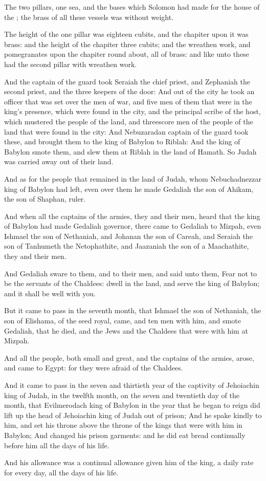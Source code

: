 \Verse The two pillars, one sea, and the bases which Solomon had made for the house of the \LORD; the brass of all these vessels was without weight.

\Verse The height of the one pillar was eighteen cubits, and the chapiter upon it was brass: and the height of the chapiter three cubits; and the wreathen work, and pomegranates upon the chapiter round about, all of brass: and like unto these had the second pillar with wreathen work.

\Verse And the captain of the guard took Seraiah the chief priest, and Zephaniah the second priest, and the three keepers of the door: \Verse And out of the city he took an officer that was set over the men of war, and five men of them that were in the king's presence, which were found in the city, and the principal scribe of the host, which mustered the people of the land, and threescore men of the people of the land that were found in the city: \Verse And Nebuzaradan captain of the guard took these, and brought them to the king of Babylon to Riblah: \Verse And the king of Babylon smote them, and slew them at Riblah in the land of Hamath. So Judah was carried away out of their land.

\Verse And as for the people that remained in the land of Judah, whom Nebuchadnezzar king of Babylon had left, even over them he made Gedaliah the son of Ahikam, the son of Shaphan, ruler.

\Verse And when all the captains of the armies, they and their men, heard that the king of Babylon had made Gedaliah governor, there came to Gedaliah to Mizpah, even Ishmael the son of Nethaniah, and Johanan the son of Careah, and Seraiah the son of Tanhumeth the Netophathite, and Jaazaniah the son of a Maachathite, they and their men.

\Verse And Gedaliah sware to them, and to their men, and said unto them, Fear not to be the servants of the Chaldees: dwell in the land, and serve the king of Babylon; and it shall be well with you.

\Verse But it came to pass in the seventh month, that Ishmael the son of Nethaniah, the son of Elishama, of the seed royal, came, and ten men with him, and smote Gedaliah, that he died, and the Jews and the Chaldees that were with him at Mizpah.

\Verse And all the people, both small and great, and the captains of the armies, arose, and came to Egypt: for they were afraid of the Chaldees.

\Verse And it came to pass in the seven and thirtieth year of the captivity of Jehoiachin king of Judah, in the twelfth month, on the seven and twentieth day of the month, that Evilmerodach king of Babylon in the year that he began to reign did lift up the head of Jehoiachin king of Judah out of prison; \Verse And he spake kindly to him, and set his throne above the throne of the kings that were with him in Babylon; \Verse And changed his prison garments: and he did eat bread continually before him all the days of his life.

\Verse And his allowance was a continual allowance given him of the king, a daily rate for every day, all the days of his life.

